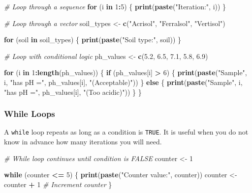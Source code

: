 \documentclass[
  10pt,
  b5paper,
  oneside]{book}
\newenvironment{Shaded}{\begin{snugshade}}{\end{snugshade}}
\newcommand{\CommentTok}[1]{\textcolor[rgb]{0.56,0.35,0.01}{\textit{#1}}}
\newcommand{\ControlFlowTok}[1]{\textcolor[rgb]{0.13,0.29,0.53}{\textbf{#1}}}
\newcommand{\DecValTok}[1]{\textcolor[rgb]{0.00,0.00,0.81}{#1}}
\newcommand{\FloatTok}[1]{\textcolor[rgb]{0.00,0.00,0.81}{#1}}
\newcommand{\FunctionTok}[1]{\textcolor[rgb]{0.13,0.29,0.53}{\textbf{#1}}}
\newcommand{\NormalTok}[1]{#1}
\newcommand{\OtherTok}[1]{\textcolor[rgb]{0.56,0.35,0.01}{#1}}
\newcommand{\SpecialCharTok}[1]{\textcolor[rgb]{0.81,0.36,0.00}{\textbf{#1}}}
\newcommand{\StringTok}[1]{\textcolor[rgb]{0.31,0.60,0.02}{#1}}
\begin{document}
\begin{Shaded}
\begin{Highlighting}[]
\CommentTok{\# Loop through a sequence}
\ControlFlowTok{for}\NormalTok{ (i }\ControlFlowTok{in} \DecValTok{1}\SpecialCharTok{:}\DecValTok{5}\NormalTok{) \{}
  \FunctionTok{print}\NormalTok{(}\FunctionTok{paste}\NormalTok{(}\StringTok{"Iteration:"}\NormalTok{, i))}
\NormalTok{\}}

\CommentTok{\# Loop through a vector}
\NormalTok{soil\_types }\OtherTok{\textless{}{-}} \FunctionTok{c}\NormalTok{(}\StringTok{"Acrisol"}\NormalTok{, }\StringTok{"Ferralsol"}\NormalTok{, }\StringTok{"Vertisol"}\NormalTok{)}

\ControlFlowTok{for}\NormalTok{ (soil }\ControlFlowTok{in}\NormalTok{ soil\_types) \{}
  \FunctionTok{print}\NormalTok{(}\FunctionTok{paste}\NormalTok{(}\StringTok{"Soil type:"}\NormalTok{, soil))}
\NormalTok{\}}

\CommentTok{\# Loop with conditional logic}
\NormalTok{ph\_values }\OtherTok{\textless{}{-}} \FunctionTok{c}\NormalTok{(}\FloatTok{5.2}\NormalTok{, }\FloatTok{6.5}\NormalTok{, }\FloatTok{7.1}\NormalTok{, }\FloatTok{5.8}\NormalTok{, }\FloatTok{6.9}\NormalTok{)}

\ControlFlowTok{for}\NormalTok{ (i }\ControlFlowTok{in} \DecValTok{1}\SpecialCharTok{:}\FunctionTok{length}\NormalTok{(ph\_values)) \{}
  \ControlFlowTok{if}\NormalTok{ (ph\_values[i] }\SpecialCharTok{\textgreater{}} \DecValTok{6}\NormalTok{) \{}
    \FunctionTok{print}\NormalTok{(}\FunctionTok{paste}\NormalTok{(}\StringTok{"Sample"}\NormalTok{, i, }\StringTok{"has pH ="}\NormalTok{, ph\_values[i], }\StringTok{"(Acceptable)"}\NormalTok{))}
\NormalTok{  \} }\ControlFlowTok{else}\NormalTok{ \{}
    \FunctionTok{print}\NormalTok{(}\FunctionTok{paste}\NormalTok{(}\StringTok{"Sample"}\NormalTok{, i, }\StringTok{"has pH ="}\NormalTok{, ph\_values[i], }\StringTok{"(Too acidic)"}\NormalTok{))}
\NormalTok{  \}}
\NormalTok{\}}
\end{Highlighting}
\end{Shaded}

\subsubsection{While Loops}\label{while-loop}

A \texttt{while} loop repeats as long as a condition is \texttt{TRUE}. It is useful when you do not know in advance how many iterations you will need.

\begin{Shaded}
\begin{Highlighting}[]
\CommentTok{\# While loop continues until condition is FALSE}
\NormalTok{counter }\OtherTok{\textless{}{-}} \DecValTok{1}

\ControlFlowTok{while}\NormalTok{ (counter }\SpecialCharTok{\textless{}=} \DecValTok{5}\NormalTok{) \{}
  \FunctionTok{print}\NormalTok{(}\FunctionTok{paste}\NormalTok{(}\StringTok{"Counter value:"}\NormalTok{, counter))}
\NormalTok{  counter }\OtherTok{\textless{}{-}}\NormalTok{ counter }\SpecialCharTok{+} \DecValTok{1}   \CommentTok{\# Increment counter}
\NormalTok{\}}
\end{Highlighting}
\end{Shaded}
\end{document}
